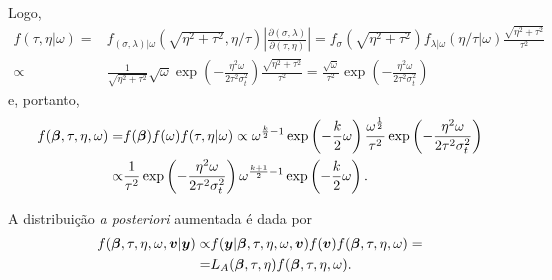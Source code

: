 Logo,
\begin{equation}
\begin{split}
f(\tau,\eta|\omega)=&f_{(\sigma,\lambda)|\omega}(\sqrt{\eta^2+\tau^2},\eta/\tau)\left|\frac{\partial(\sigma,\lambda)}{\partial(\tau,\eta)}\right|=f_\sigma(\sqrt{\eta^2+\tau^2})f_{\lambda|\omega}(\eta/\tau|\omega)\frac{\sqrt{\eta^2+\tau^2}}{\tau^2} \\
\propto&\frac{1}{\sqrt{\eta^2+\tau^2}}\sqrt{\omega}\exp\left(-\frac{\eta^2\omega}{2\tau^2\sigma^2_t}\right)\frac{\sqrt{\eta^2+\tau^2}}{\tau^2}=\frac{\sqrt{\omega}}{\tau^2}\exp\left(-\frac{\eta^2\omega}{2\tau^2\sigma^2_t}\right)
\end{split}
\end{equation}
e, portanto,
\begin{equation}
\begin{split}\label{eq:prior_skewn}
f({\boldsymbol{\beta}},\tau,\eta,\omega)=&f({\boldsymbol{\beta}})f(\omega)f(\tau,\eta|\omega)\propto \omega^{\frac{k}{2}-1}\exp\left(-\frac{k}{2}\omega\right)\frac{\omega^\frac{1}{2}}{\tau^2}\exp\left(-\frac{\eta^2\omega}{2\tau^2\sigma^2_t}\right) \\
\propto&\frac{1}{\tau^2}\exp\left(-\frac{\eta^2\omega}{2\tau^2\sigma_t^2}\right)\omega^{\frac{k+1}{2}-1}\exp\left(-\frac{k}{2}\omega\right).
\end{split}
\end{equation}

A distribuição \textit{a posteriori} aumentada é dada por
\begin{equation}
\begin{split}\label{eq:post_aum_skewn}
f({\boldsymbol{\beta}},\tau,\eta,\omega,{\boldsymbol{v}}|{\boldsymbol{y}})\propto & f({\boldsymbol{y}}|{\boldsymbol{\beta}},\tau,\eta,\omega,{\boldsymbol{v}})f({\boldsymbol{v}})f({\boldsymbol{\beta}},\tau,\eta,\omega)=\\
=&L_A({\boldsymbol{\beta}},\tau,\eta)f({\boldsymbol{\beta}},\tau,\eta,\omega).
\end{split}
\end{equation}

